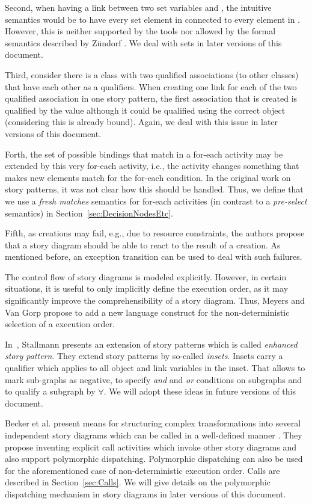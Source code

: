 Second, when having a link between two set variables  and , the intuitive semantics would be to have every set element in  connected to every element in  .
However, this is neither supported by the tools nor allowed by the formal semantics described by Z\"{u}ndorf \cite{Zun01}.
We deal with sets in later versions of this document.

Third, consider there is a class with two qualified associations (to other classes) that have each other as a qualifiers.
When creating one link for each of the two qualified association in one story pattern, the first association that is created is qualified by the  value although it could be qualified using the correct object (considering this is already bound).
Again, we deal with this issue in later versions of this document.

Forth, the set of possible bindings that match in a for-each activity may be extended by this very for-each activity, i.e., the activity changes something that makes new elements match for the for-each condition. In the original work on story patterns, it was not clear how this should be handled.
Thus, we define that we use a \emph{fresh matches} semantics for for-each activities (in contrast to a \emph{pre-select} semantics) in Section~\ref{sec:DecisionNodesEtc}.

Fifth, as creations may fail, e.g., due to resource constraints, the authors propose that a story diagram should be able to react to the result of a creation.
As mentioned before, an exception transition can be used to deal with such failures.

The control flow of story diagrams is modeled explicitly.
However, in certain situations, it is useful to only implicitly define the execution order, as it may significantly improve the comprehensibility of a story diagram.
Thus, Meyers and Van Gorp \cite{MG08} propose to add a new language construct for the non-deterministic selection of a execution order.

In~\cite{Sta08}, Stallmann presents an extension of story patterns which is called \emph{enhanced story pattern}. They extend story patterns by so-called \emph{insets}. Insets carry a qualifier which applies to all object and link variables in the inset. That allows to mark sub-graphs as negative, to specify \emph{and} and \emph{or} conditions on subgraphs and to qualify a subgraph by $\forall$. We will adopt these ideas in future versions of this document.

Becker et al. present means for structuring complex transformations into several independent story diagrams which can be called in a well-defined manner \cite{BvDHR11}.
They propose inventing explicit call activities which invoke other story diagrams and also support polymorphic dispatching.
Polymorphic dispatching can also be used for the aforementioned case of non-deterministic execution order.
Calls are described in Section~\ref{sec:Calls}.
We will give details on the polymorphic dispatching mechanism in story diagrams in later versions of this document.

